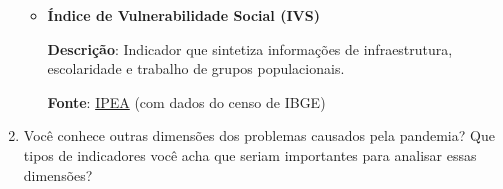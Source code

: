 \begin{task}{}
\begin{enumerate}
\begin{itemize}[itemsep=1em]
\item \textbf{Índice de Vulnerabilidade Social (IVS)}

\textbf{Descrição}: Indicador que sintetiza informações de infraestrutura, escolaridade e trabalho de grupos populacionais.

\textbf{Fonte}: \href{http://ivs.ipea.gov.br/index.php/pt/}{IPEA} (com dados do censo de IBGE)
\end{itemize}

\item Você conhece outras dimensões dos problemas causados pela pandemia? Que tipos de indicadores você acha que seriam importantes para analisar essas dimensões?

\end{enumerate}


\end{task}

